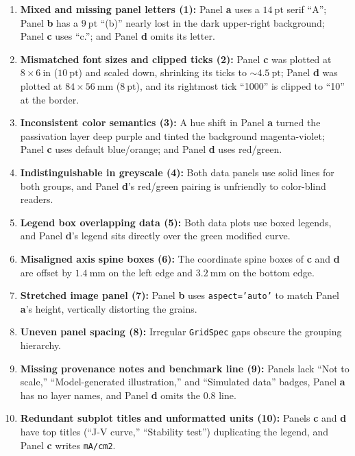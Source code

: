 \begin{enumerate}
\item \textbf{Mixed and missing panel letters (1):} Panel \textbf{a} uses a $14\ \text{pt}$ serif ``A''; Panel \textbf{b} has a $9\ \text{pt}$ ``(b)'' nearly lost in the dark upper-right background; Panel \textbf{c} uses ``c.''; and Panel \textbf{d} omits its letter.
\item \textbf{Mismatched font sizes and clipped ticks (2):} Panel \textbf{c} was plotted at $8 \times 6\ \text{in}$ ($10\ \text{pt}$) and scaled down, shrinking its ticks to $\sim 4.5\ \text{pt}$; Panel \textbf{d} was plotted at $84 \times 56\ \text{mm}$ ($8\ \text{pt}$), and its rightmost tick ``1000'' is clipped to ``10'' at the border.
\item \textbf{Inconsistent color semantics (3):} A hue shift in Panel \textbf{a} turned the passivation layer deep purple and tinted the background magenta-violet; Panel \textbf{c} uses default blue/orange; and Panel \textbf{d} uses red/green.
\item \textbf{Indistinguishable in greyscale (4):} Both data panels use solid lines for both groups, and Panel \textbf{d}'s red/green pairing is unfriendly to color-blind readers.
\item \textbf{Legend box overlapping data (5):} Both data plots use boxed legends, and Panel \textbf{d}'s legend sits directly over the green modified curve.
\item \textbf{Misaligned axis spine boxes (6):} The coordinate spine boxes of \textbf{c} and \textbf{d} are offset by $1.4\ \text{mm}$ on the left edge and $3.2\ \text{mm}$ on the bottom edge.
\item \textbf{Stretched image panel (7):} Panel \textbf{b} uses \texttt{aspect='auto'} to match Panel \textbf{a}'s height, vertically distorting the grains.
\item \textbf{Uneven panel spacing (8):} Irregular \texttt{GridSpec} gaps obscure the grouping hierarchy.
\item \textbf{Missing provenance notes and benchmark line (9):} Panels lack ``Not to scale,'' ``Model-generated illustration,'' and ``Simulated data'' badges, Panel \textbf{a} has no layer names, and Panel \textbf{d} omits the $0.8$ line.
\item \textbf{Redundant subplot titles and unformatted units (10):} Panels \textbf{c} and \textbf{d} have top titles (``J-V curve,'' ``Stability test'') duplicating the legend, and Panel \textbf{c} writes \texttt{mA/cm2}.
\end{enumerate}

